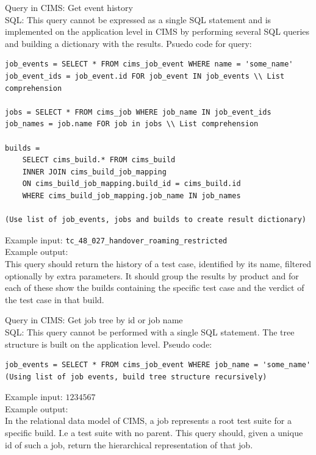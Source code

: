 \label{q:tchistory}
Query in CIMS: Get event history \\
SQL: This query cannot be expressed as a single SQL statement and is implemented on the application level in CIMS by performing several SQL queries and building a dictionary with the results. Psuedo code for query:
\begin{verbatim}
job_events = SELECT * FROM cims_job_event WHERE name = 'some_name'
job_event_ids = job_event.id FOR job_event IN job_events \\ List comprehension

jobs = SELECT * FROM cims_job WHERE job_name IN job_event_ids
job_names = job.name FOR job in jobs \\ List comprehension

builds = 
    SELECT cims_build.* FROM cims_build
    INNER JOIN cims_build_job_mapping
    ON cims_build_job_mapping.build_id = cims_build.id
    WHERE cims_build_job_mapping.job_name IN job_names

(Use list of job_events, jobs and builds to create result dictionary)

\end{verbatim}
Example input: {\tt tc\_48\_027\_handover\_roaming\_restricted } \\
Example output: \\
This query should return the history of a test case, identified by its name, filtered optionally by extra parameters. It should group the results by product and for each of these show the builds containing the specific test case and the verdict of the test case in that build.

\label{q:gettesttree}
Query in CIMS: Get job tree by id or job name \\
SQL: This query cannot be performed with a single SQL statement. The tree structure is built on the application level. Pseudo code:
\begin{verbatim}
job_events = SELECT * FROM cims_job_event WHERE job_name = 'some_name'
(Using list of job events, build tree structure recursively)
\end{verbatim}
Example input: $1234567$\\
Example output: \\
In the relational data model of CIMS, a job represents a root test suite for a specific build. I.e a test suite with no parent. This query should, given a unique id of such a job, return the hierarchical representation of that job.


